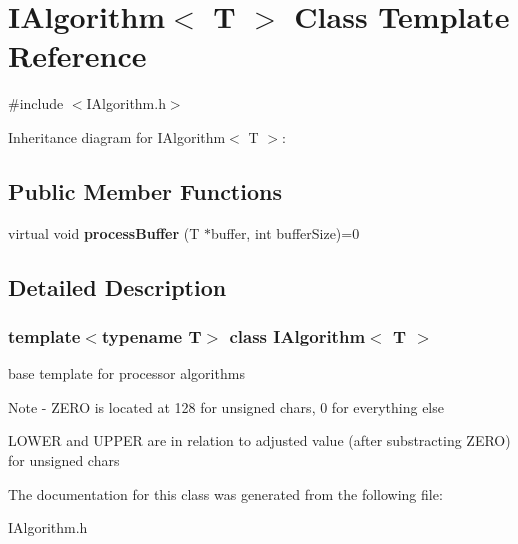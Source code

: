 \hypertarget{classIAlgorithm}{}\section{I\+Algorithm$<$ T $>$ Class Template Reference}
\label{classIAlgorithm}


{\ttfamily \#include $<$I\+Algorithm.\+h$>$}



Inheritance diagram for I\+Algorithm$<$ T $>$\+:
\subsection*{Public Member Functions}
\begin{DoxyCompactItemize}
\item 
\mbox{\label{classIAlgorithm_af5d33413d39ce61d543a73f951a4a4eb}} 
virtual void {\bfseries process\+Buffer} (T $\ast$buffer, int buffer\+Size)=0
\end{DoxyCompactItemize}


\subsection{Detailed Description}
\subsubsection*{template$<$typename T$>$\newline
class I\+Algorithm$<$ T $>$}


\begin{DoxyItemize}
\item base template for processor algorithms \begin{DoxyNote}{Note}
-\/ Z\+E\+RO is located at 128 for unsigned chars, 0 for everything else 

L\+O\+W\+ER and U\+P\+P\+ER are in relation to adjusted value (after substracting Z\+E\+RO) for unsigned chars 
\end{DoxyNote}

\end{DoxyItemize}

The documentation for this class was generated from the following file\+:\begin{DoxyCompactItemize}
\item 
I\+Algorithm.\+h\end{DoxyCompactItemize}
